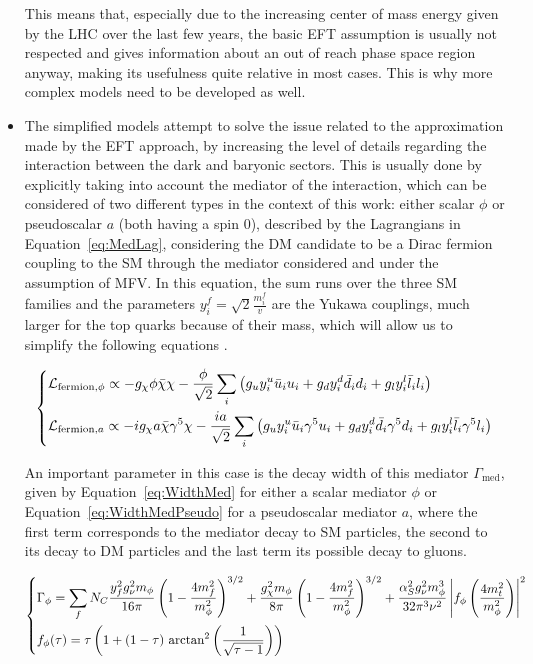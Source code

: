 \documentclass[a4paper, 10pt, openright]{report}
\begin{document}
\begin{itemize}
This means that, especially due to the increasing center of mass energy given by the \ac{LHC} over the last few years, the basic \ac{EFT} assumption is usually not respected and gives information about an out of reach phase space region anyway, making its usefulness quite relative in most cases. This is why more complex models need to be developed as well.

\item The simplified models attempt to solve the issue related to the approximation made by the \ac{EFT} approach, by increasing the level of details regarding the interaction between the dark and baryonic sectors. This is usually done by explicitly taking into account the mediator of the interaction, which can be considered of two different types in the context of this work: either scalar $\phi$ or pseudoscalar $a$ (both having a spin 0), described by the Lagrangians in Equation~\ref{eq:MedLag}, considering the \ac{DM} candidate to be a Dirac fermion coupling to the \ac{SM} through the mediator considered and under the assumption of \acf{MFV}. In this equation, the sum runs over the three \ac{SM} families and the parameters $y_i^f = \sqrt{2} \frac{m_i^f}{v}$ are the Yukawa couplings, much larger for the top quarks because of their mass, which will allow us to simplify the following equations \cite{SimplifiedModels}.

\begin{equation}
\label{eq:MedLag}
\begin{dcases}
\mathcal{L}_{\text{fermion}, \phi} \propto - g_\chi \phi \bar \chi \chi - \frac{\phi}{\sqrt{2}} \sum_i \left (g_u y_i^u \bar u_i u_i + g_d y_i^d \bar d_i d_i + g_l y_i^l \bar l_i l_i \right ) \\
\mathcal{L}_{\text{fermion}, a} \propto - i g_\chi a \bar \chi \gamma^5 \chi - \frac{i a}{\sqrt{2}} \sum_i \left (g_u y_i^u \bar u_i \gamma^5 u_i + g_d y_i^d \bar d_i \gamma^5 d_i + g_l y_i^l \bar l_i \gamma^5 l_i \right )
\end{dcases}
\end{equation}

An important parameter in this case is the decay width of this mediator $\Gamma_{\text{med}}$, given by Equation~\ref{eq:WidthMed} for either a scalar mediator $\phi$ or Equation~\ref{eq:WidthMedPseudo} for a pseudoscalar mediator $a$, where the first term corresponds to the mediator decay to \ac{SM} particles, the second to its decay to \ac{DM} particles and the last term its possible decay to gluons. 

\begin{equation}
\label{eq:WidthMed}
\begin{dcases}
\Gamma_{\phi} = \sum_f N_C \frac{y_f^2 g_\nu^2 m_\phi}{16 \pi} \left (1- \frac{4 m_f^2}{m_\phi^2} \right )^{3/2} + \frac{g_\chi^2 m_\phi}{8 \pi} \left (1- \frac{4 m_f^2}{m_\phi^2} \right )^{3/2} + \frac{\alpha_S^2 g_\nu^2 m_\phi^3}{32 \pi^3 \nu^2} \left \lvert f_\phi \left (\frac{4m_t^2}{m_\phi^2} \right ) \right \rvert^2 \\
f_\phi(\tau) = \tau \left (1 + (1 - \tau) \text{ arctan}^2 \left ( \frac{1}{\sqrt{\tau -1}} \right ) \right )
\end{dcases}
\end{equation}


\end{itemize}
\end{document}
